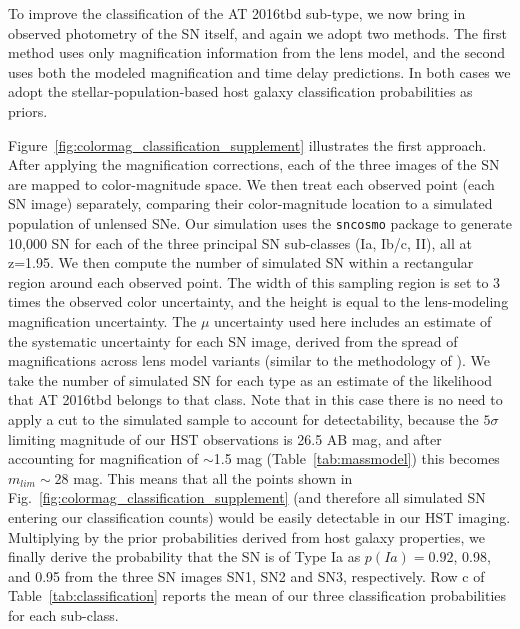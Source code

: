 \documentclass[12pt]{article}
\def\SNABC{AT 2016tbd\xspace}
\begin{document}
To improve the classification of the \SNABC sub-type, we now bring in observed photometry of the SN itself, and again we adopt two methods.  The first method uses only magnification information from the lens model, and the second uses both the modeled magnification and time delay predictions.  In both cases we adopt the stellar-population-based host galaxy classification probabilities as priors.

Figure~\ref{fig:colormag_classification_supplement} illustrates the first approach.  After applying the magnification corrections, each of the three images of the SN are mapped to color-magnitude space.  We then treat each observed point (each SN image) separately, comparing their color-magnitude location to a simulated population of unlensed SNe.  Our simulation uses the {\tt sncosmo} package \cite{barbary_sncosmo_2016}  to generate 10,000 SN for each of the three principal SN sub-classes (Ia, Ib/c, II), all at z=1.95.  
We then compute the number of simulated SN within a rectangular region around each observed point. The width of this sampling region is set to 3 times the observed color uncertainty, and the height is equal to the lens-modeling magnification uncertainty. The $\mu$ uncertainty used here includes an estimate of the systematic uncertainty for each SN image, derived from the spread of magnifications across lens model variants (similar to the methodology of \cite{newman_resolving_2018}).  
We take the number of simulated SN for each type as an estimate of the likelihood that \SNABC belongs to that class. Note that in this case there is no need to apply a cut to the simulated sample to account for detectability, because the $5\sigma$ limiting magnitude of our HST observations is 26.5 AB mag, and after accounting for magnification of $\sim$1.5 mag (Table~\ref{tab:massmodel}) this becomes $m_{lim}\sim28$ mag. This means that all the points shown in Fig.~\ref{fig:colormag_classification_supplement} (and therefore all simulated SN entering our classification counts) would be easily detectable in our HST imaging.  Multiplying by the prior probabilities derived from host galaxy properties, we finally derive the probability that the SN is of Type Ia as $p(Ia)=0.92$, 0.98, and 0.95 from the three SN images SN1, SN2 and SN3, respectively. Row c of Table~\ref{tab:classification} reports the mean of our three classification probabilities for each sub-class. 
\end{document}
